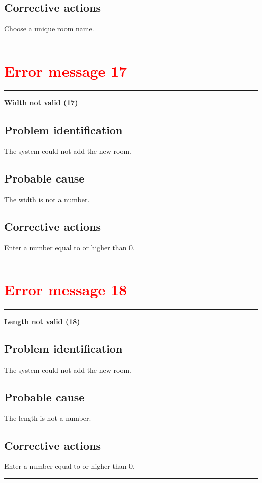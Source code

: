 \subsection{Corrective actions}
Choose a unique room name.
\vspace{0.5cm}
\hrule
\hfill




\section{\textbf{\textcolor{red}{Error message 17}}}
\hrule
\vspace{0.5cm}
\textbf{Width not valid (17)}
\subsection{Problem identification}
The system could not add the new room.

\subsection{Probable cause}
The width is not a number.

\subsection{Corrective actions}
Enter a number equal to or higher than 0.
\vspace{0.5cm}
\hrule
\hfill




\section{\textbf{\textcolor{red}{Error message 18}}}
\hrule
\vspace{0.5cm}
\textbf{Length not valid (18)}
\subsection{Problem identification}
The system could not add the new room.

\subsection{Probable cause}
The length is not a number.

\subsection{Corrective actions}
Enter a number equal to or higher than 0.
\vspace{0.5cm}
\hrule
\hfill




